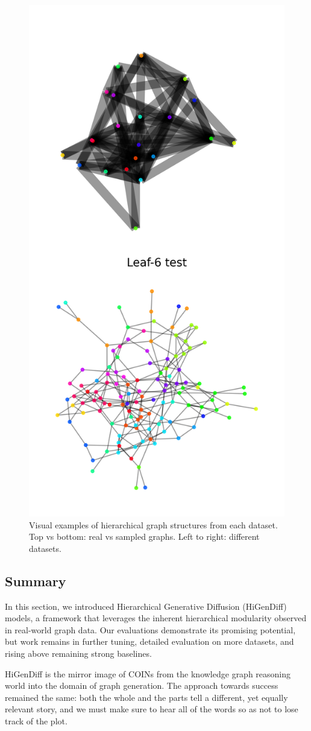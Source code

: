\begin{figure}[H]
        \hfill
    \includegraphics[width=0.15\linewidth]{figures/higendiff/lfr_gen.png}
    \caption{Visual examples of hierarchical graph structures from each dataset. Top vs bottom: real vs sampled graphs. Left to right: different datasets.}
    \label{fig:higendiff_examples}
\end{figure}

\subsection{Summary}

In this section, we introduced Hierarchical Generative Diffusion (HiGenDiff) models, a framework that leverages the inherent hierarchical modularity observed in real-world graph data. Our evaluations demonstrate its promising potential, but work remains in further tuning, detailed evaluation on more datasets, and rising above remaining strong baselines.

HiGenDiff is the mirror image of COINs from the knowledge graph reasoning world into the domain of graph generation. The approach towards success remained the same: both the whole and the parts tell a different, yet equally relevant story, and we must make sure to hear all of the words so as not to lose track of the plot.